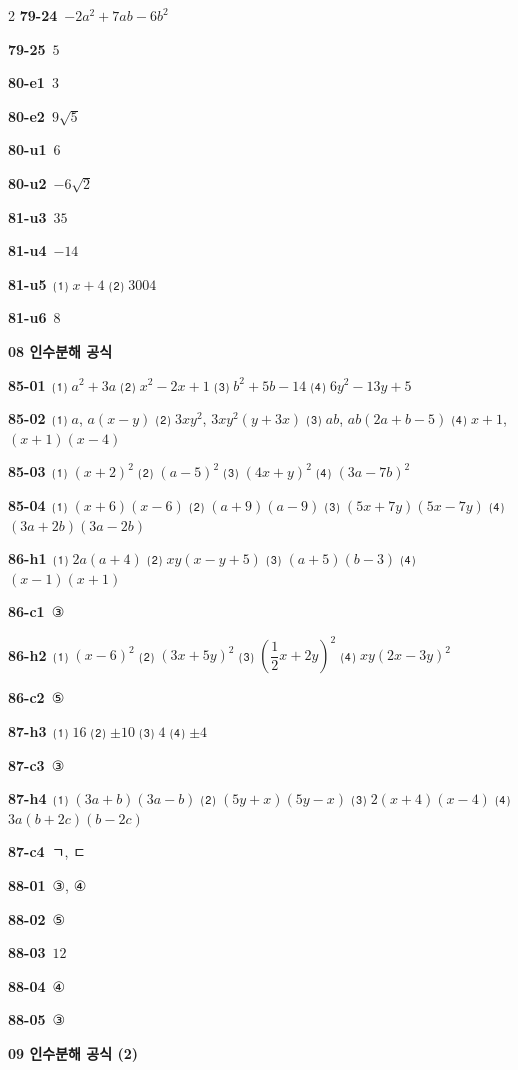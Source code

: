 \documentclass[10pt,a4paper]{article}
\begin{document}
\begin{multicols}{2}
\noindent\textbf{79-24}\ $-2a^2+7ab-6b^2$\par
\noindent\textbf{79-25}\ $5$\par
\noindent\textbf{80-e1}\ $3$\par
\noindent\textbf{80-e2}\ $9\sqrt{5}$\par
\noindent\textbf{80-u1}\ $6$\par
\noindent\textbf{80-u2}\ $-6\sqrt{2}$\par
\noindent\textbf{81-u3}\ $35$\par
\noindent\textbf{81-u4}\ $-14$\par
\noindent\textbf{81-u5}\ ⑴ $x+4$ ⑵ $3004$\par
\noindent\textbf{81-u6}\ $8$\par
\noindent\textbf{08 인수분해 공식}\par\smallskip
\noindent\textbf{85-01}\ ⑴ $a^2+3a$ ⑵ $x^2-2x+1$ ⑶ $b^2+5b-14$ ⑷ $6y^2-13y+5$\par
\noindent\textbf{85-02}\ ⑴ $a$, $a(x-y)$ ⑵ $3xy^2$, $3xy^2(y+3x)$ ⑶ $ab$, $ab(2a+b-5)$ ⑷ $x+1$, $(x+1)(x-4)$\par
\noindent\textbf{85-03}\ ⑴ $(x+2)^2$ ⑵ $(a-5)^2$ ⑶ $(4x+y)^2$ ⑷ $(3a-7b)^2$\par
\noindent\textbf{85-04}\ ⑴ $(x+6)(x-6)$ ⑵ $(a+9)(a-9)$ ⑶ $(5x+7y)(5x-7y)$ ⑷ $(3a+2b)(3a-2b)$\par
\noindent\textbf{86-h1}\ ⑴ $2a(a+4)$ ⑵ $xy(x-y+5)$ ⑶ $(a+5)(b-3)$ ⑷ $(x-1)(x+1)$\par
\noindent\textbf{86-c1}\ ③\par
\noindent\textbf{86-h2}\ ⑴ $(x-6)^2$ ⑵ $(3x+5y)^2$ ⑶ $\left(\dfrac{1}{2}x+2y\right)^2$ ⑷ $xy(2x-3y)^2$\par
\noindent\textbf{86-c2}\ ⑤\par
\noindent\textbf{87-h3}\ ⑴ $16$ ⑵ $\pm10$ ⑶ $4$ ⑷ $\pm4$\par
\noindent\textbf{87-c3}\ ③\par
\noindent\textbf{87-h4}\ ⑴ $(3a+b)(3a-b)$ ⑵ $(5y+x)(5y-x)$ ⑶ $2(x+4)(x-4)$ ⑷ $3a(b+2c)(b-2c)$\par
\noindent\textbf{87-c4}\ ㄱ, ㄷ\par
\noindent\textbf{88-01}\ ③, ④\par
\noindent\textbf{88-02}\ ⑤\par
\noindent\textbf{88-03}\ $12$\par
\noindent\textbf{88-04}\ ④\par
\noindent\textbf{88-05}\ ③\par
\noindent\textbf{09 인수분해 공식 (2)}\par\smallskip

\end{multicols}
\end{document}

